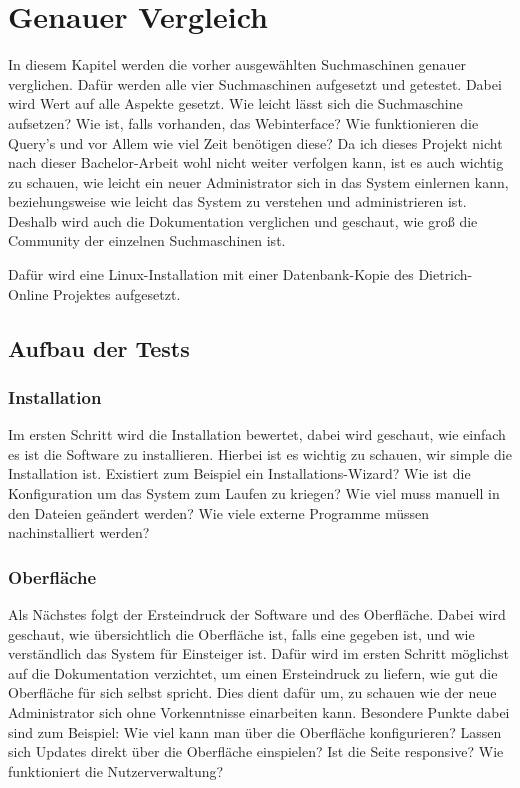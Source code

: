 \chapter{Genauer Vergleich}

In diesem Kapitel werden die vorher ausgewählten Suchmaschinen genauer verglichen. Dafür werden alle vier Suchmaschinen aufgesetzt und getestet. Dabei wird Wert auf alle Aspekte gesetzt. Wie leicht lässt sich die Suchmaschine aufsetzen? Wie ist, falls vorhanden, das Webinterface? Wie funktionieren die Query’s und vor Allem wie viel Zeit benötigen diese? Da ich dieses Projekt nicht nach dieser Bachelor-Arbeit wohl nicht weiter verfolgen kann, ist es auch wichtig zu schauen, wie leicht ein neuer Administrator sich in das System einlernen kann, beziehungsweise wie leicht das System zu verstehen und administrieren ist. Deshalb wird auch die Dokumentation verglichen und geschaut, wie groß die Community der einzelnen Suchmaschinen ist. 

Dafür wird eine Linux-Installation mit einer Datenbank-Kopie des Dietrich-Online Projektes aufgesetzt. 

\section{Aufbau der Tests}

\subsection{Installation}

Im ersten Schritt wird die Installation bewertet, dabei wird geschaut, wie einfach es ist die Software zu installieren. Hierbei ist es wichtig zu schauen, wir simple die Installation ist. Existiert zum Beispiel ein Installations-Wizard? Wie ist die Konfiguration um das System zum Laufen zu kriegen? Wie viel muss manuell in den Dateien geändert werden? Wie viele externe Programme müssen nachinstalliert werden?

\subsection{Oberfläche}

Als Nächstes folgt der Ersteindruck der Software und des Oberfläche. Dabei wird geschaut, wie übersichtlich die Oberfläche ist, falls eine gegeben ist, und wie verständlich das System für Einsteiger ist. Dafür wird im ersten Schritt möglichst auf die Dokumentation verzichtet, um einen Ersteindruck zu liefern, wie gut die Oberfläche für sich selbst spricht. Dies dient dafür um, zu schauen wie der neue Administrator sich ohne Vorkenntnisse einarbeiten kann. Besondere Punkte dabei sind zum Beispiel: Wie viel kann man über die Oberfläche konfigurieren? Lassen sich Updates direkt über die Oberfläche einspielen? Ist die Seite responsive? Wie funktioniert die Nutzerverwaltung?

